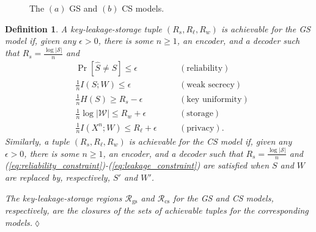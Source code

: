 \documentclass[journal,10pt,twoside]{IEEEtran}
\newtheorem{definition}{Definition}
\begin{document}
\begin{figure}
{
	}
	\caption{The $(a)$ GS and $(b)$ CS models.}\label{fig:problemsetup}
\end{figure}


\begin{definition}\label{def:achievabilityGSCS}
	 A key-leakage-storage tuple $(R_s,R_\ell,R_w)$ is \emph{achievable} for the GS model if, given any $\epsilon>0$, there is some $n\!\geq\!1$, an encoder, and a decoder such that $R_s=\frac{\log|\mathcal{S}|}{n}$ and
	\begin{align}
	&\Pr[\widehat{S} \neq S] \leq \epsilon&&\quad (\text{reliability})\label{eq:reliability_constraint}\\
	&\frac{1}{n}I(S;W) \leq \epsilon&&\quad(\text{weak secrecy})\label{eq:secrecyleakage_constraint}\\
	&\frac{1}{n}H(S)\geq R_s-\epsilon&&\quad(\text{key uniformity}) \label{eq:uniformity_constraint}\\
	&\frac{1}{n}\log\big|\mathcal{W}\big| \leq R_w+\epsilon&&\quad(\text{storage})\label{eq:storage_constraint}\\
	&\frac{1}{n}I(X^n;W) \leq R_\ell+\epsilon&&\quad(\text{privacy}).\label{eq:leakage_constraint}
	\end{align}
	Similarly, a tuple $(R_s,R_\ell,R_w)$ is \emph{achievable} for the CS model if, given any $\epsilon>0$, there is some $n\!\geq\!1$, an encoder, and a decoder such that $R_s=\frac{\log|\mathcal{S}|}{n}$ and (\ref{eq:reliability_constraint})-(\ref{eq:leakage_constraint}) are satisfied when $S$ and $W$ are replaced by, respectively, $S'$ and $W'$.
	 
    The \emph{key-leakage-storage} regions $\mathcal{R}_{\text{gs}}$ and $\mathcal{R}_{\text{cs}}$ for the GS and CS models, respectively, are the closures of the sets of achievable tuples for the corresponding models.\hfill $\lozenge$
\end{definition}
\end{document}
